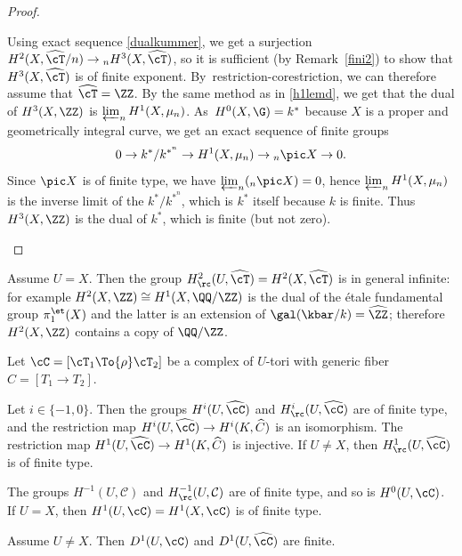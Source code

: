 \begin{proof}
\begin{enumeratea}
\item
Using exact sequence \eqref{dualkummer}, we get a surjection
$H^2(X,\widehat \cT /n) \to {}_n H^3(X, \widehat \cT)$, so it is sufficient
(by Remark~\ref{fini2}) to show that $H^3(X, \widehat \cT)$ is of finite
exponent. By~restriction-corestriction, we can therefore assume that
$\widehat \cT=\ZZ$.
By the same method as in \eqref{h1lemd}, we get that the dual of
$H^3(X,\ZZ)$ is $\varprojlim_n H^1(X,\mu_n)$. As~$H^0(X,\G)=k^*$ because
$X$ is a proper and geometrically integral curve,
we get an exact sequence of finite groups
\[
0 \to k^*/k^{*^n} \to H^1(X,\mu_n) \to {}_n \pic X \to 0.
\]
Since $\pic X$ is of finite type, we have $\varprojlim_n (_n \pic X)=0$,
hence $\varprojlim_n H^1(X,\mu_n)$ is the inverse limit of the $k^*/k^{*^n}$,
which is $k^*$ itself because $k$ is finite. Thus $H^3(X,\ZZ)$ is
the dual of $k^*$, which is finite (but not zero).\qedhere
\end{enumeratea}
\end{proof}

\begin{rema} \label{xcase}
Assume $U=X$. Then the group $H^2_\rc(U,\widehat \cT)=H^2(X, \widehat \cT)$
is in general infinite: for example $H^2(X,\ZZ) \cong H^1(X,\QQ/\ZZ)$ is the
dual of the étale fundamental group $\pi_1^{\et}(X)$ and the latter is
an extension of $\gal(\kbar/k)=\widehat \ZZ$; therefore
$H^2(X,\ZZ)$ contains a copy of $\QQ/\ZZ$.
\end{rema}

\begin{prop} \label{finityp}

Let $\cC=[\cT_1 \To{\rho} \cT_2]$ be a complex of $U$-tori with
generic fiber $C=[T_1 \to T_2]$.
\begin{enumeratea}
\item\label{finitypa}
Let $i \in \{-1, 0\}$. Then the groups $H^i(U,\widehat \cC)$
and $H^i_\rc(U,\widehat \cC)$ are of finite type, and the
restriction map $H^i(U,\widehat \cC) \to H^i(K,\widehat C)$ is an isomorphism.
The restriction map $H^1(U,\widehat \cC) \to H^1(K,\widehat C)$ is injective.
If $U \neq X$, then $H^1_\rc(U,\widehat \cC)$ is of finite type.

\item\label{finitypb}
The groups $H^{-1}(U,\mathcal C)$ and $H^{-1}_\rc(U,\mathcal C)$
are of finite type, and so is $H^0(U,\cC)$.
If $U=X$, then $H^1(U,\cC)=H^1(X,\cC)$ is of finite type.

\item\label{finitypc}
Assume $U \neq X$. Then $D^1(U,\cC)$ and $D^1(U,\widehat \cC)$ are finite.
\end{enumeratea}
\end{prop}

